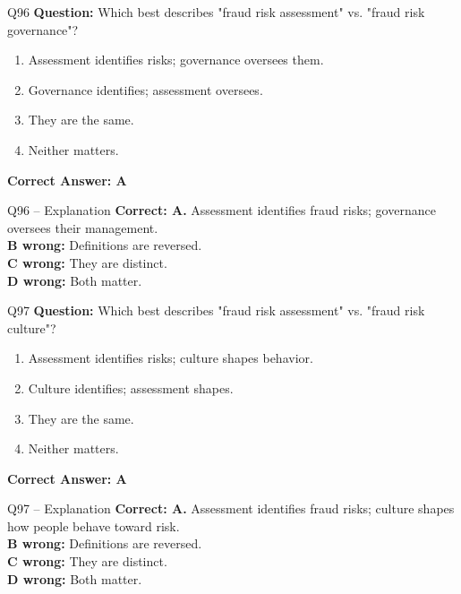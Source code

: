 \documentclass[aspectratio=169,10pt]{beamer}
\begin{document}
	\begin{frame}[t]{Q96}
		\small
		\textbf{Question:} Which best describes "fraud risk assessment" vs. "fraud risk governance"?
		\begin{enumerate}[label=\Alph*.,itemsep=1pt,topsep=2pt]
			\item Assessment identifies risks; governance oversees them.
			\item Governance identifies; assessment oversees.
			\item They are the same.
			\item Neither matters.
		\end{enumerate}
		\vspace{4pt}
		\textbf{Correct Answer: A}
	\end{frame}
	
	\begin{frame}[t]{Q96 -- Explanation}
		\small
		\textbf{Correct: A.} Assessment identifies fraud risks; governance oversees their management. \\[4pt]
		\textbf{B wrong:} Definitions are reversed. \\[2pt]
		\textbf{C wrong:} They are distinct. \\[2pt]
		\textbf{D wrong:} Both matter.
	\end{frame}
	
	\begin{frame}[t]{Q97}
		\small
		\textbf{Question:} Which best describes "fraud risk assessment" vs. "fraud risk culture"?
		\begin{enumerate}[label=\Alph*.,itemsep=1pt,topsep=2pt]
			\item Assessment identifies risks; culture shapes behavior.
			\item Culture identifies; assessment shapes.
			\item They are the same.
			\item Neither matters.
		\end{enumerate}
		\vspace{4pt}
		\textbf{Correct Answer: A}
	\end{frame}
	
	\begin{frame}[t]{Q97 -- Explanation}
		\small
		\textbf{Correct: A.} Assessment identifies fraud risks; culture shapes how people behave toward risk. \\[4pt]
		\textbf{B wrong:} Definitions are reversed. \\[2pt]
		\textbf{C wrong:} They are distinct. \\[2pt]
		\textbf{D wrong:} Both matter.
	\end{frame}
	
\end{document}
